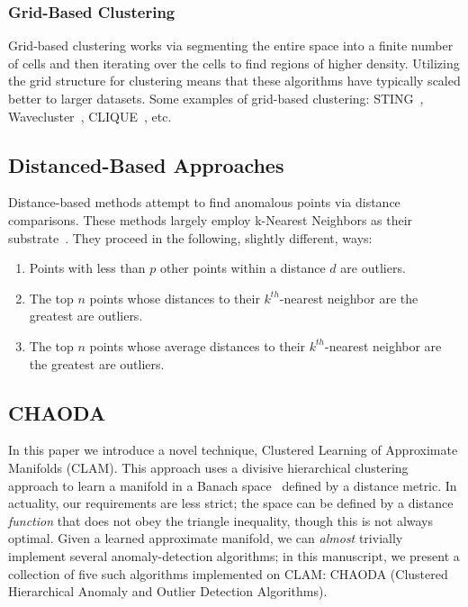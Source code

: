 \subsubsection{Grid-Based Clustering}

Grid-based clustering works via segmenting the entire space into a finite number of cells and then iterating over the cells to find regions of higher density.
Utilizing the grid structure for clustering means that these algorithms have typically scaled better to larger datasets.
Some examples of grid-based clustering: 
STING~\cite{sting:wang}, 
Wavecluster~\cite{Wavecluster:Sheikholeslami:2000}, 
CLIQUE~\cite{rakesh_agrawal_automatic_1998}, 
etc.

\subsection{Distanced-Based Approaches}

Distance-based methods attempt to find anomalous points via distance comparisons.
These methods largely employ k-Nearest Neighbors as their substrate~\cite{wang_progress_2019}.
They proceed in the following, slightly different, ways:

\begin{enumerate}
    \item Points with less than $p$ other points within a distance $d$ are outliers.
    \item The top $n$ points whose distances to their $k^{th}$-nearest neighbor are the greatest are outliers.
    \item The top $n$ points whose average distances to their $k^{th}$-nearest neighbor are the greatest are outliers.
\end{enumerate}

\subsection{CHAODA}

In this paper we introduce a novel technique, Clustered Learning of Approximate Manifolds (CLAM).
This approach uses a divisive hierarchical clustering approach to learn a manifold in a Banach space~\cite{} defined by a distance metric.
In actuality, our requirements are less strict; the space can be defined by a distance \textit{function} that does not obey the triangle inequality, though this is not always optimal. 
Given a learned approximate manifold, we can \textit{almost} trivially implement several anomaly-detection algorithms; in this manuscript, we present a collection of five such algorithms implemented on CLAM: CHAODA (Clustered Hierarchical Anomaly and Outlier Detection Algorithms).

